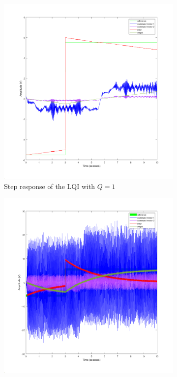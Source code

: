 \begin{figure}[H]
    \centering
    \begin{subfigure}[b]{0.5\textwidth}
        \centering
        \includegraphics[width=\textwidth]{Pictures/Q_1.png}
        \caption{Step response of the LQI with $Q = 1$}
        \label{fig:step_response_Q1}
    \end{subfigure}%
    \begin{subfigure}[b]{0.5\textwidth}
        \centering
        \includegraphics[width=\textwidth]{Pictures/Q_500.png}

\end{subfigure}
\end{figure}
